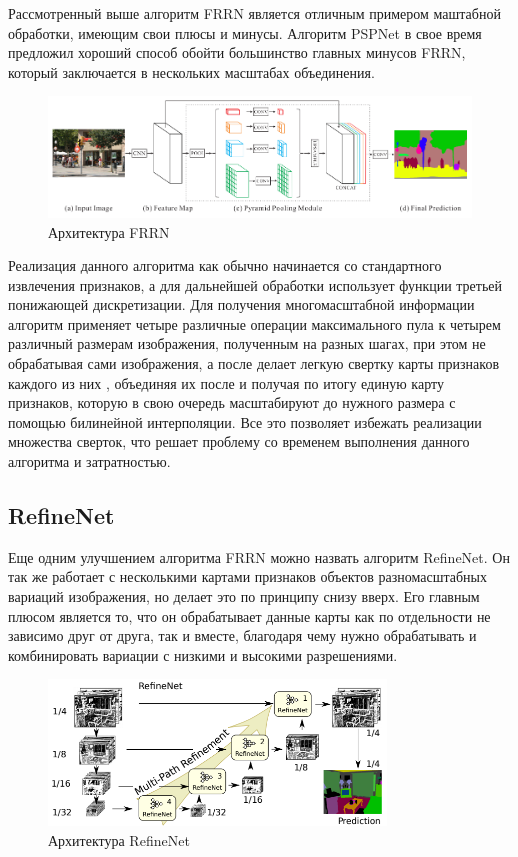 \documentclass[bachelor, och, coursework]{shiza}
\begin{document}
Рассмотренный выше алгоритм FRRN является отличным примером маштабной обработки, имеющим свои плюсы и минусы. Алгоритм PSPNet в свое время предложил хороший 
способ обойти большинство главных минусов FRRN, который заключается в нескольких масштабах объединения. 

\begin{figure}[H]
    \centering
    \includegraphics[width=1\textwidth]{12}
    \caption{Архитектура FRRN}
    \label{fig:img1}
\end{figure}

Реализация данного алгоритма как обычно начинается со стандартного извлечения признаков, а для дальнейшей обработки использует функции третьей понижающей 
дискретизации. Для получения многомасштабной информации алгоритм применяет четыре различные операции максимального пула к четырем различный размерам изображения, 
полученным на разных шагах, при этом не обрабатывая сами изображения, а после делает легкую свертку карты признаков каждого из них , объединяя их после и получая 
по итогу единую карту признаков, которую в свою очередь масштабируют до нужного размера с помощью билинейной интерполяции. Все это позволяет избежать реализации 
множества сверток, что решает проблему со временем выполнения данного алгоритма и затратностью.

\subsection{RefineNet}

Еще одним улучшением алгоритма FRRN можно назвать алгоритм RefineNet. Он так же работает с несколькими картами признаков объектов разномасштабных вариаций изображения, 
но делает это по принципу снизу вверх. Его главным плюсом является то, что он обрабатывает данные карты как по отдельности не зависимо друг от друга, так и вместе, благодаря
чему нужно обрабатывать и комбинировать вариации с низкими и высокими разрешениями.

\begin{figure}[H]
    \centering
    \includegraphics[width=0.8\textwidth]{13}
    \caption{Архитектура RefineNet}
    \label{fig:img1}
\end{figure}
\end{document}
